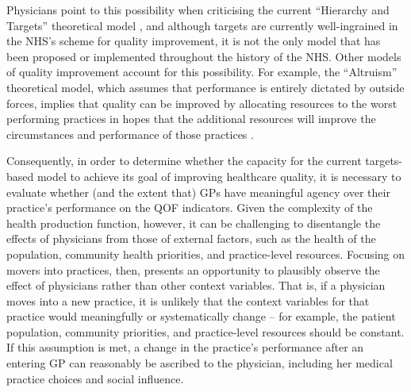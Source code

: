 \documentclass[11pt]{article}
\begin{document}
Physicians point to this possibility when criticising the current ``Hierarchy and Targets'' theoretical model  \citep{oliverCanFinancialIncentives2009}, and although targets are currently well-ingrained in the NHS's scheme for quality improvement, it is not the only model that has been proposed or implemented throughout the history of the NHS. Other models of quality improvement account for this possibility. For example, the ``Altruism'' theoretical model, which assumes that performance is entirely dictated by outside forces, implies that quality can be improved by allocating resources to the worst performing practices in hopes that the additional resources will improve the circumstances and performance of those practices \citep{bevanModelsGovernancePublic2013}.

Consequently, in order to determine whether the capacity for the current targets-based model to achieve its goal of improving healthcare quality, it is necessary to evaluate whether (and the extent that) GPs have meaningful agency over their practice's performance on the QOF indicators. Given the complexity of the health production function, however, it can be challenging to disentangle the effects of physicians from those of external factors, such as the health of the population, community health priorities, and practice-level resources. Focusing on movers into practices, then, presents an opportunity to plausibly observe the effect of physicians rather than other context variables. That is, if a physician moves into a new practice, it is unlikely that the context variables for that practice would meaningfully or systematically change -- for example, the patient population, community priorities, and practice-level resources should be constant. If this assumption is met, a change in the practice's performance after an entering GP can reasonably be ascribed to the physician, including her medical practice choices and social influence.
\end{document}
